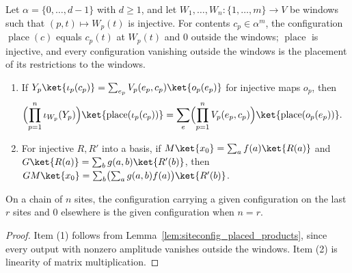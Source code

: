 \begin{lemma}
    \label{lem:qc_placed_configurations}
    \leanok
    Let $\alpha=\{0,\dots,d-1\}$ with $d\ge1$, and let
    $W_1,\dots,W_n\colon\{1,\dots,m\}\to V$ be windows such that
    $(p,t)\mapsto W_p(t)$ is injective. For contents $c_p\in\alpha^m$, the
    configuration $\operatorname{place}(c)$ equals $c_p(t)$ at $W_p(t)$ and $0$
    outside the windows; $\operatorname{place}$ is injective, and every
    configuration vanishing outside the windows is the placement of its
    restrictions to the windows.
    \begin{enumerate}
        \item If $Y_p\ket{\iota_p(c_p)}=\sum_{e_p}V_p(e_p,c_p)\ket{o_p(e_p)}$
              for injective maps $o_p$, then
              \begin{align}
                  \Bigl(\prod_{p=1}^n\iota_{W_p}(Y_p)\Bigr)
                  \ket{\operatorname{place}(\iota_p(c_p))}
                   & =\sum_{e}\Bigl(\prod_{p=1}^n V_p(e_p,c_p)\Bigr)
                  \ket{\operatorname{place}(o_p(e_p))}.\notag
              \end{align}
        \item For injective $R,R'$ into a basis, if
              $M\ket{x_0}=\sum_a f(a)\ket{R(a)}$ and
              $G\ket{R(a)}=\sum_b g(a,b)\ket{R'(b)}$, then
              $GM\ket{x_0}=\sum_b\bigl(\sum_a g(a,b)f(a)\bigr)\ket{R'(b)}$.
    \end{enumerate}
    On a chain of $n$ sites, the configuration carrying a given configuration
    on the last $r$ sites and $0$ elsewhere is the given configuration when
    $n=r$.
\end{lemma}
\begin{proof}
    \leanok
    Item (1) follows from Lemma~\ref{lem:siteconfig_placed_products}, since
    every output with nonzero amplitude vanishes outside the windows. Item (2)
    is linearity of matrix multiplication.
\end{proof}

